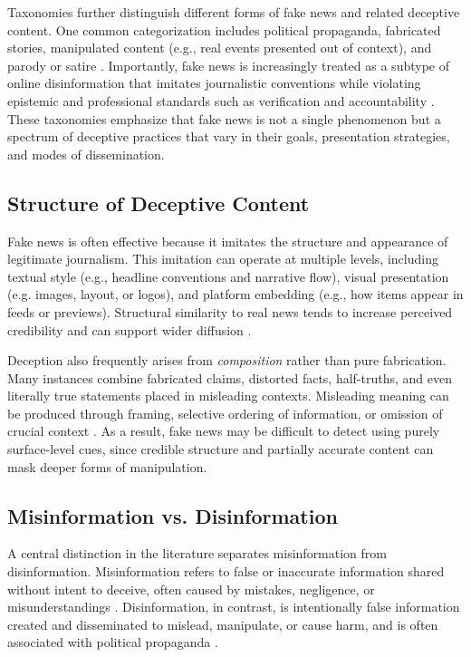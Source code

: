 Taxonomies further distinguish different forms of fake news and related deceptive content. One common categorization includes political propaganda, fabricated stories, manipulated content (e.g., real events presented out of context), and parody or satire \cite{10704605}. Importantly, fake news is increasingly treated as a subtype of online disinformation that imitates journalistic conventions while violating epistemic and professional standards such as verification and accountability \cite{encyclopedia2010043}. These taxonomies emphasize that fake news is not a single phenomenon but a spectrum of deceptive practices that vary in their goals, presentation strategies, and modes of dissemination.

\subsection{Structure of Deceptive Content}

Fake news is often effective because it imitates the structure and appearance of legitimate journalism. This imitation can operate at multiple levels, including textual style (e.g., headline conventions and narrative flow), visual presentation (e.g. images, layout, or logos), and platform embedding (e.g., how items appear in feeds or previews). Structural similarity to real news tends to increase perceived credibility and can support wider diffusion \cite{appel-2019}.

Deception also frequently arises from \emph{composition} rather than pure fabrication. Many instances combine fabricated claims, distorted facts, half-truths, and even literally true statements placed in misleading contexts. Misleading meaning can be produced through framing, selective ordering of information, or omission of crucial context \cite{encyclopedia2010043}. As a result, fake news may be difficult to detect using purely surface-level cues, since credible structure and partially accurate content can mask deeper forms of manipulation.

\subsection{Misinformation vs. Disinformation}

A central distinction in the literature separates misinformation from disinformation. Misinformation refers to false or inaccurate information shared without intent to deceive, often caused by mistakes, negligence, or misunderstandings \cite{10704605}. Disinformation, in contrast, is intentionally false information created and disseminated to mislead, manipulate, or cause harm, and is often associated with political propaganda \cite{10704605,fi16080298}.

